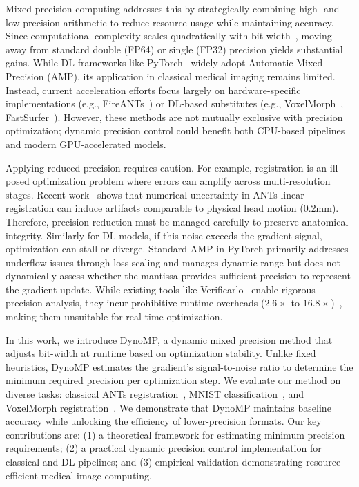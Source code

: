 \documentclass[runningheads]{llncs}
\begin{document}
Mixed precision computing addresses this by strategically combining high- and low-precision arithmetic to reduce resource usage while maintaining accuracy. Since computational complexity scales quadratically with bit-width~\cite{Wang2019-qe}, moving away from standard double (FP64) or single (FP32) precision yields substantial gains. While DL frameworks like PyTorch~\cite{Paszke2019-vk} widely adopt Automatic Mixed Precision (AMP), its application in classical medical imaging remains limited. Instead, current acceleration efforts focus largely on hardware-specific implementations (e.g., FireANTs~\cite{Jena2024-ud}) or DL-based substitutes (e.g., VoxelMorph~\cite{Balakrishnan2019-rx}, FastSurfer~\cite{Henschel2022-wa}). However, these methods are not mutually exclusive with precision optimization; dynamic precision control could benefit both CPU-based pipelines and modern GPU-accelerated models.

Applying reduced precision requires caution. For example, registration is an
ill-posed optimization problem where errors can amplify across multi-resolution
stages. Recent work~\cite{Mirhakimi2025-qb} shows that numerical uncertainty in
ANTs linear registration can induce artifacts comparable to physical head motion
(0.2mm). Therefore, precision reduction must be managed carefully to preserve
anatomical integrity. Similarly for DL models, if this noise exceeds the
gradient signal, optimization can stall or diverge. Standard AMP in PyTorch
primarily addresses underflow issues through loss scaling and manages dynamic
range but does not dynamically assess whether the mantissa provides sufficient precision
to represent the gradient update. While existing tools like
Verificarlo~\cite{Denis2015-zf,Chatelain2019-vw} enable rigorous precision
analysis, they incur prohibitive runtime overheads ($2.6\times$ to
$16.8\times$)~\cite{Chatelain2019-vw}, making them unsuitable for real-time
optimization.

In this work, we introduce DynoMP, a dynamic mixed precision method that adjusts bit-width at runtime based on optimization stability. Unlike fixed heuristics, DynoMP estimates the gradient's signal-to-noise ratio to determine the minimum required precision per optimization step. We evaluate our method on diverse tasks: classical ANTs registration~\cite{Avants2020-xx}, MNIST classification~\cite{Deng2012-hh}, and VoxelMorph registration~\cite{Balakrishnan2019-rx}. We demonstrate that DynoMP maintains baseline accuracy while unlocking the efficiency of lower-precision formats. Our key contributions are: (1) a theoretical framework for estimating minimum precision requirements; (2) a practical dynamic precision control implementation for classical and DL pipelines; and (3) empirical validation demonstrating resource-efficient medical image computing.
\end{document}
